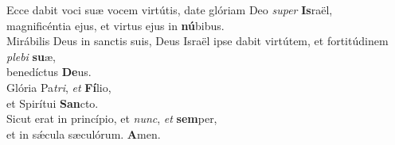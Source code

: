 \oddverse Ecce dabit voci suæ vocem virtútis, date glóriam Deo \textit{su}\textit{per} \textbf{Is}raël,~\*\\
\oddverse magnificéntia ejus, et virtus ejus in \textbf{nú}bibus.\\
\evenverse Mirábilis Deus in sanctis suis, Deus Israël ipse dabit virtútem, et fortitúdinem \textit{ple}\textit{bi} \textbf{su}æ,~\*\\
\evenverse benedíctus \textbf{De}us.\\
\oddverse Glória Pa\textit{tri}, \textit{et} \textbf{Fí}lio,~\*\\
\oddverse et Spirítui \textbf{San}cto.\\
\evenverse Sicut erat in princípio, et \textit{nunc}, \textit{et} \textbf{sem}per,~\*\\
\evenverse et in sǽcula sæculórum. \textbf{A}men.\\
